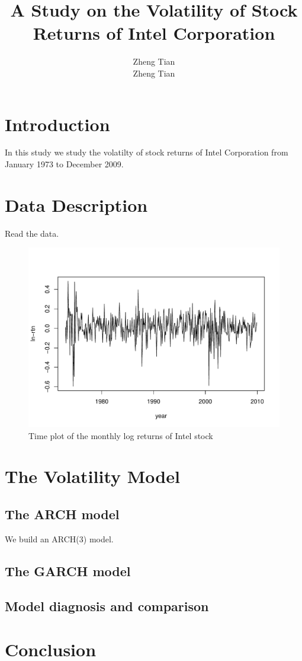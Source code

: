 \documentclass[a4paper,11pt]{article}\usepackage[]{graphicx}\usepackage[]{color}
\title{A Study on the Volatility of Stock Returns of Intel Corporation}
\author{Zheng Tian \\
        Zheng Tian}
\makeatletter
\def\maxwidth{ %
  \ifdim\Gin@nat@width>\linewidth
    \linewidth
  \else
    \Gin@nat@width
  \fi
}
\newenvironment{knitrout}{}{} %
\makeatother
\begin{document}
\maketitle
\section{Introduction}
\label{sec:intro}

In this study we study the volatilty of stock returns of Intel Corporation from January 1973 to December 2009. 


\section{Data Description}
\label{sec:data_descrip}

Read the data. 
\begin{knitrout}
\color{fgcolor}\begin{figure}

{\centering \includegraphics[width=\maxwidth]{figure/ln_rtn-1} 

}

\caption[Time plot of the monthly log returns of Intel stock]{Time plot of the monthly log returns of Intel stock}\label{fig:ln_rtn}
\end{figure}


\end{knitrout}


\section{The Volatility Model}
\label{sec:volatility_model}

\subsection*{The ARCH model}

We build an ARCH(3) model.


\subsection*{The GARCH model}


\subsection*{Model diagnosis and comparison}


\section{Conclusion}
\label{sec:conclusion}
\end{document}

